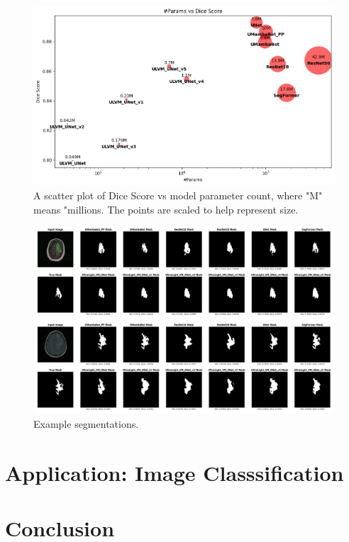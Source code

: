 \documentclass[conference]{IEEEtran}
\begin{document}
\begin{figure}[!t]
    \centering
    \includegraphics[width=\columnwidth]{imgs/balls.png}
    \caption{A scatter plot of Dice Score vs model parameter count, where "M" means "millions. The points are scaled to help represent size.}
    \label{fig:balls}
\end{figure}

\begin{figure}[!t]
    \centering
    \includegraphics[width=\columnwidth]{imgs/masks.png}
    \caption{Example segmentations.}
    \label{fig:segs}
\end{figure}

\section{Application: Image Classsification}

\section{Conclusion}
\end{document}
